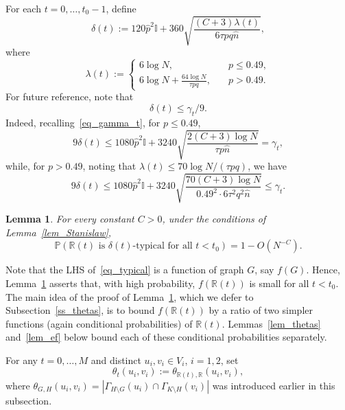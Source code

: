 \documentclass[12pt,reqno]{amsart}
\newcommand{\Prob} {\mathbb {P}}
\newcommand{\prob}[1]{\Prob\left(#1\right)}
\newcommand{\R} {\mathbb R}
\newcommand{\I} {\mathbb I}
\newtheorem{lemma}[theorem]{Lemma}
\theoremstyle{definition}
\newcommand{\deltat}{\delta(t)}
\newcommand{\lhs}{LHS}
\begin{document}
For each $t = 0, \dots, t_0 - 1$, define
\begin{equation}
  \label{eq_deltat}
	\deltat := 120\hat p^2 \I + 360 \sqrt{\frac{(C + 3)\lambda(t)}{6\tau pq\hat n }} ,
\end{equation}
where
\begin{equation}
  \label{eq_lambda}
	\lambda(t)  :=
\begin{cases}
  6 \log N, \quad &p \le 0.49, \\
  6\log N + \frac{64\log N}{\tau p q}, \quad &p > 0.49.
\end{cases}
\end{equation}
For future reference, note that
\begin{equation}
  \label{eq_deltat_gammat}
\deltat \le \gamma_t/9.
\end{equation}
Indeed, recalling~\eqref{eq_gamma_t}, for $p\le0.49$,
\[
	9\deltat \le 1080\hat p^2 \I + 3240 \sqrt{\frac{2(C + 3)\log N}{\tau p\hat n }} =\gamma_t,
\]
while, for $p > 0.49$, noting that $\lambda(t)\le 70\log N/(\tau pq)$, we have
\[
9\deltat \le 1080\hat p^2 \I + 3240 \sqrt{\frac{70(C + 3)\log N}{0.49^2 \cdot 6\tau^2q^2\hat n}} \le \gamma_t.
\]
\begin{lemma}
  \label{lem_typical}
	For every constant $C > 0$, under the conditions of Lemma~\ref{lem_Stanislaw},
\begin{equation*}
  \prob{\R(t) \text{ is } \deltat\text{-typical for all } t < t_0} = 1 - O(N^{-C}).
\end{equation*}
\end{lemma}
Note that the \lhs{} of~\eqref{eq_typical} is a function of graph $G$, say $f(G)$. Hence, Lemma~\ref{lem_typical} asserts that, with high probability, $f(\R(t))$ is small for all $t < t_0$.
The main idea of the proof of Lemma~\ref{lem_typical}, which we defer to Subsection~\ref{ss_thetas}, is to bound $f(\R(t))$ by a ratio of two simpler functions (again conditional probabilities) of $\R(t)$. Lemmas~\ref{lem_thetas} and~\ref{lem_ef} below bound each of these conditional probabilities separately.

For any $t = 0, \dots, M$ and distinct $u_i, v_i \in V_i$, $i = 1,2$, set
\begin{equation}
  \label{eq_theta_t}
\theta_t(u_i,v_i) := \theta_{\R(t),\R}(u_i,v_i),
\end{equation}
where $\theta_{G,H}(u_i,v_i) = |\Gamma_{H\setminus G}(u_i)\cap\Gamma_{K\setminus H}(v_i)|$ was introduced earlier in this subsection.
\end{document}
